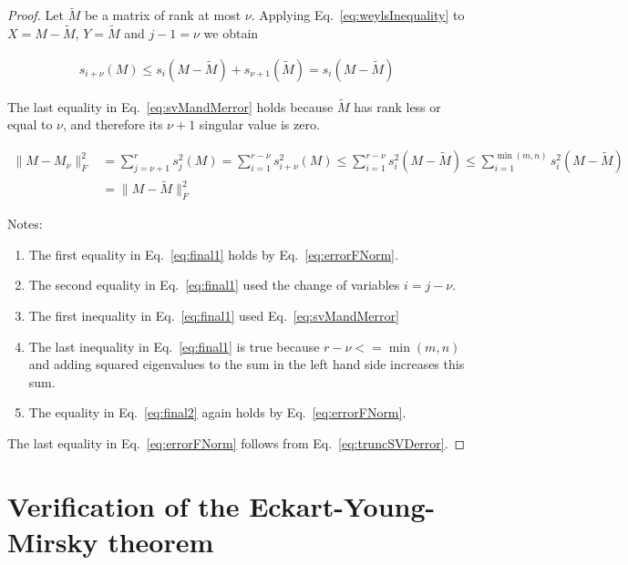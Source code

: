 \documentclass[12pt]{article}
\begin{document}
\begin{appendices}
\begin{proof}
        Let $\tilde{M}$ be a matrix of rank at most $\nu$. Applying
        Eq.~\ref{eq:weylsInequality} to $X=M-\tilde{M}$, $Y=\tilde{M}$ and
        $j-1=\nu$ we obtain

        \begin{align}
            s_{i+\nu}(M)\leq s_i(M-\tilde{M})+s_{\nu+1}(\tilde{M})=s_i(M-\tilde{M})\label{eq:svMandMerror}
        \end{align}

        The last equality in Eq.~\ref{eq:svMandMerror} holds because $\tilde{M}$
        has rank less or equal to $\nu$, and therefore its $\nu+1$ singular value is zero.

        \begin{align}
            \|M-M_\nu\|_F^2&=\sum_{j=\nu+1}^rs_j^2(M)=\sum_{i=1}^{r-\nu}s_{i+\nu}^2(M)\leq\sum_{i=1}^{r-\nu}s_i^2(M-\tilde{M})\leq\sum_{i=1}^{\min(m,n)}s_i^2(M-\tilde{M})\label{eq:final1}\\
                           &=\|M-\tilde{M}\|_F^2\label{eq:final2}
        \end{align}

        Notes:
        \begin{enumerate}
            \item The first equality in Eq.~\ref{eq:final1} holds by
                Eq.~\ref{eq:errorFNorm}.
            \item The second equality in Eq.~\ref{eq:final1} used the change of
                variables $i=j-\nu$.
            \item The first inequality in Eq.~\ref{eq:final1} used
                Eq.~\ref{eq:svMandMerror}
            \item The last inequality in Eq.~\ref{eq:final1} is true because
                $r-\nu<=\min(m,n)$ and adding squared eigenvalues to the sum in
                the left hand side increases this sum.
            \item The equality in Eq.~\ref{eq:final2} again holds by
                Eq.~\ref{eq:errorFNorm}.
        \end{enumerate}

        The last equality in Eq.~\ref{eq:errorFNorm} follows from
        Eq.~\ref{eq:truncSVDerror}.

    \end{proof}

\section{Verification of the Eckart-Young-Mirsky theorem}
\label{sec:verificationEckartYoungMirsky}


\end{appendices}
\end{document}
